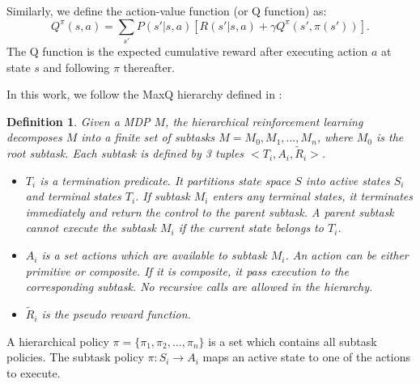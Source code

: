 \documentclass{article} %
\newtheorem{definition}{Definition}
\begin{document}
Similarly, we define the action-value function (or Q function) as:
\begin{equation}
    Q^{\pi}(s, a) = \sum_{s'}P(s'|s, a)[R(s'|s, a) + \gamma Q^{\pi}(s', \pi(s'))].
    \label{eq:Q}
\end{equation}
The Q function is the expected cumulative reward after executing action $a$ at state $s$ and following
$\pi$ thereafter.




In this work, we follow the MaxQ hierarchy defined in \cite{MaxQJ}:
\begin{definition}
    Given a MDP $M$, the hierarchical reinforcement learning decomposes $M$ into a finite
    set of subtasks $M = {M_0, M_1, \dots, M_n}$, where $M_0$ is the root subtask. 
    Each subtask is defined by 3 tuples $<T_i, A_i, \tilde{R}_i>$. 
    \begin{itemize}{}
    \item $T_i$ is a termination predicate. It partitions state space $S$ into active states $S_i$ and
                terminal states $T_i$. If subtask $M_i$ enters any terminal states, it terminates immediately
                and return the control to the parent subtask. A parent subtask cannot execute the subtask
                $M_i$ if the current state belongs to $T_i$.
    \item $A_i$ is a set actions which are available to subtask $M_i$. An action can be either primitive or composite.
                If it is composite, it pass execution to the corresponding subtask. No recursive calls 
                are allowed in the hierarchy.
    \item $\tilde{R}_i$ is the pseudo reward function.
    \end{itemize}
\end{definition}
A hierarchical policy $\pi = \{\pi_1, \pi_2, \dots, \pi_n\}$ is a set which contains all subtask policies. 
The subtask policy $\pi: S_i \rightarrow A_i$ maps an active state to one of the actions to execute.
\end{document}
